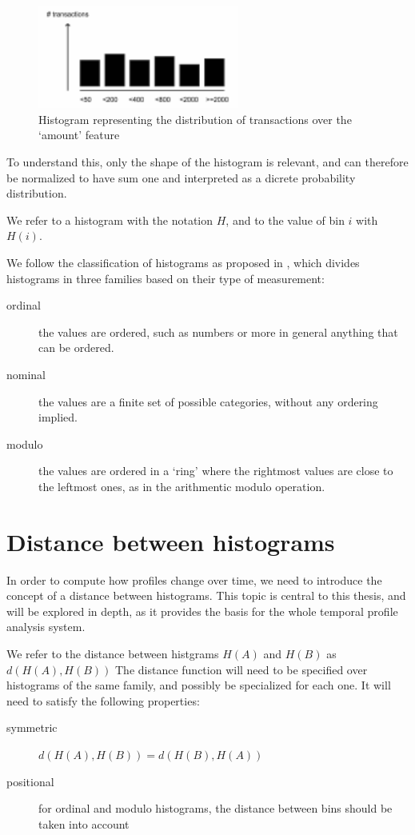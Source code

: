\begin{figure}[h]
\centering
\includegraphics[width=250]{images/flat_histogram.pdf}
\caption{Histogram representing the distribution of transactions over the `amount' feature}
\label{fig:flat_histogram}
\end{figure}

To understand this, only the shape of the histogram is relevant, and can therefore be normalized to have sum one and interpreted as a dicrete probability distribution.

We refer to a histogram with the notation $H$, and to the value of bin $i$ with $H(i)$.

We follow the classification of histograms as proposed in \cite{histogram}, which divides histograms in three families based on their type of measurement:

\begin{description}
\item[ordinal] the values are ordered, such as numbers or more in general anything that can be ordered.
\item[nominal] the values are a finite set of possible categories, without any ordering implied.
\item[modulo] the values are ordered in a `ring' where the rightmost values are close to the leftmost ones, as in the arithmentic modulo operation.
\end{description}

\section{Distance between histograms}

In order to compute how profiles change over time, we need to introduce the concept of a distance between histograms. This topic is central to this thesis, and will be explored in depth, as it provides the basis for the whole temporal profile analysis system.

We refer to the distance between histgrams $H(A)$ and $H(B)$ as $d(H(A), H(B))$
The distance function will need to be specified over histograms of the same family, and possibly be specialized for each one. It will need to satisfy the following properties:
\begin{description}
  \item[symmetric] $d(H(A), H(B)) = d(H(B), H(A))$
  \item[positional] for ordinal and modulo histograms, the distance between bins should be taken into account
\end{description}

